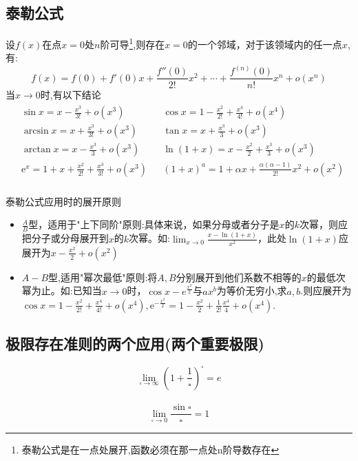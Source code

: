 \documentclass[12pt, a4paper, oneside, UTF8]{ctexbook}
\begin{document}
\begin{sloppypar}
    \subsection{泰勒公式}
    设$f(x)$在点$x=0$处$n$阶可导\footnote{泰勒公式是在一点处展开,函数必须在那一点处n阶导数存在},则存在$x=0$的一个邻域，对于该领域内的任一点$x$,有:
    $$
        f(x)=f(0)+f'(0)x+\frac{f''(0)}{2!}x^2+\cdots+\frac{f^{(n)}(0)}{n!}x^n+o(x^n)
    $$
    当$x\to 0$时,有以下结论
    \begin{align*}
        \boxed{\begin{aligned}
                        & \sin x =x-\frac{x^3}{3!}+o(x^3)                                &  & \cos x =1-\frac{x^2}{2!}+\frac{x^4}{4!}+o(x^4)                  \\
                        & \arcsin x =x+\frac{x^3}{3!}+o(x^3)                             &  & \tan x =x+\frac{x^3}3+o(x^3)                                    \\
                        & \arctan x =x-\frac{x^{3}}{3}+o(x^{3})                          &  & \ln(1+x) =x-\frac{x^{2}}{2}+\frac{x^{3}}{3}+o(x^{3})            \\
                        & \mathrm{e}^{x} =1+x+\frac{x^{2}}{2!}+\frac{x^{3}}{3!}+o(x^{3}) &  & (1+x)^{a} =1+\alpha x+\frac{\alpha(\alpha-1)}{2!}x^{2}+o(x^{2}) \\
                   \end{aligned}}
    \end{align*}
    \begin{criterion}{泰勒公式应用时的展开原则}{}
        \begin{itemize}
            \item $\frac{A}{B}$型，适用于"上下同阶"原则:具体来说，如果分母或者分子是$x$的$k$次幂，则应把分子或分母展开到$x$的$k$次幂。如:$\lim_{x\to0}\frac{x-\ln(1+x)}{x^{2}}$，此处$\ln(1+x)$应展开为$x-\frac{x^2}{2}+o(x^2)$
            \item $A-B$型,适用"幂次最低"原则:将$A,B$分别展开到他们系数不相等的$x$的最低次幂为止。如:已知当$x\to0$时，$\cos x-e^{\frac{x^2}2}$与$ax^b$为等价无穷小,求$a,b$.则应展开为$\cos x=1-\frac{x^2}{2!}+\frac{x^4}{4!}+o(x^4),\mathrm{e}^{-\frac{x^2}{2}}=1-\frac{x^2}{2}+\frac{1}{2!}\frac{x^4}{4}+o(x^4).$
        \end{itemize}
    \end{criterion}
    \subsection{极限存在准则的两个应用(两个重要极限)}
    $$
        \lim _ { \square \rightarrow \infty } ( 1 + \frac { 1 } { \square } ) ^ { \square } = e
    $$
    \\
    $$
        \lim _ { \square \rightarrow 0 } \frac { \sin \square } { \square } = 1
    $$


\end{sloppypar}
\end{document}
